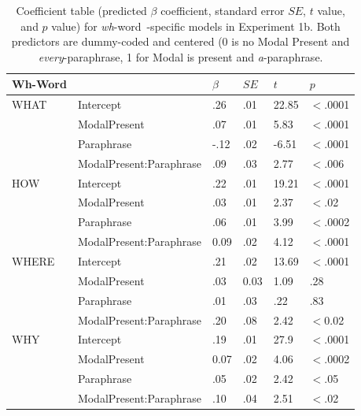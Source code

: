 \documentclass[12pt,letterpaper,table,svgnames,dvipsnames]{article}
\newcommand{\whw}{\emph{wh}-word~}
\begin{document}
\begin{table}[p!]
\begin{center} 
\caption{Coefficient table (predicted $\beta$ coefficient, standard error $SE$, $t$ value, and $p$ value) for \whw-specific models in Experiment 1b. Both predictors are dummy-coded and centered (0 is no Modal Present and \emph{every}-paraphrase, 1 for Modal is present and \emph{a}-paraphrase.} 
\label{sub-model_res_ex1b} 
\begin{tabular}{llllll} 
\toprule
Wh-Word & {} & $\beta$ & $SE$ & $t$ & $p$\\
\midrule
WHAT & Intercept & .26 & .01 & 22.85 & $<$.0001\\
{} & ModalPresent & .07 & .01 & 5.83 & $<$.0001\\
{} & Paraphrase & -.12 & .02 & -6.51 & $<$.0001\\
{} & ModalPresent:Paraphrase & .09 & .03 & 2.77 & $<$.006\\
\midrule
HOW & Intercept & .22 & .01 & 19.21 & $<$.0001\\
{} & ModalPresent & .03 & .01 & 2.37 & $<$.02\\
{} & Paraphrase & .06 & .01 & 3.99 & $<$.0002\\
{} & ModalPresent:Paraphrase & 0.09 & .02 & 4.12 & $<$.0001\\
\midrule
WHERE & Intercept & .21 & .02 & 13.69 & $<$.0001\\
{} & ModalPresent & .03 & 0.03 & 1.09 & .28\\
{} & Paraphrase & .01 & .03 & .22 & .83\\
{} & ModalPresent:Paraphrase & .20 & .08 & 2.42 & $<$0.02\\
\midrule
WHY & Intercept & .19 & .01 & 27.9 & $<$.0001\\
{} & ModalPresent & 0.07 & .02 & 4.06 & $<$.0002\\
{} & Paraphrase & .05 & .02 & 2.42 & $<$.05\\
{} & ModalPresent:Paraphrase & .10 & .04 & 2.51 & $<$.02\\

\end{tabular}
\end{center}
\end{table}
\end{document}

